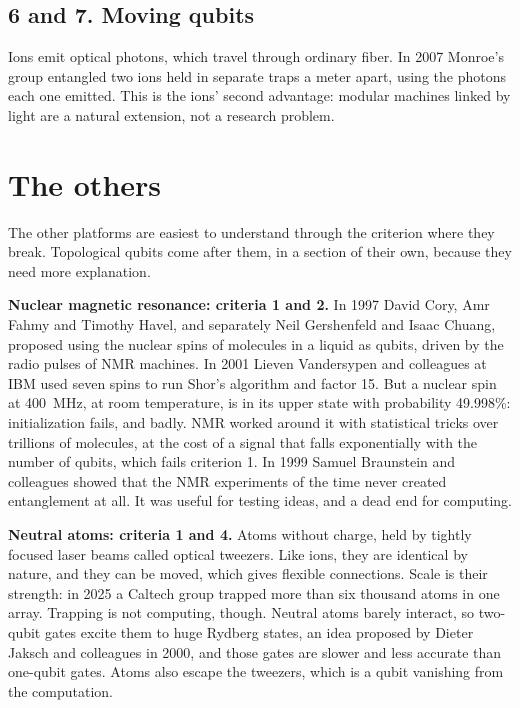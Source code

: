 \subsection*{6 and 7. Moving qubits}

Ions emit optical photons, which travel through ordinary fiber. In 2007 Monroe's group
entangled two ions held in separate traps a meter apart, using the photons each one
emitted. This is the ions' second advantage: modular machines linked by light are a natural
extension, not a research problem.

\section{The others}\label{sec:others}

The other platforms are easiest to understand through the criterion where they break. Topological
qubits come after them, in a section of their own, because they need more explanation.

\textbf{Nuclear magnetic resonance: criteria 1 and 2.} In 1997 David Cory, Amr Fahmy and
Timothy Havel, and separately Neil Gershenfeld and Isaac Chuang, proposed using the nuclear
spins of molecules in a liquid as qubits, driven by the radio pulses of NMR machines. In 2001
Lieven Vandersypen and colleagues at IBM used seven spins to run Shor's algorithm and factor
15. But a nuclear spin at 400~MHz, at room temperature, is in its upper state with probability
49.998\%: initialization fails, and badly. NMR worked around it with statistical tricks over
trillions of molecules, at the cost of a signal that falls exponentially with the number of
qubits, which fails criterion 1. In 1999 Samuel Braunstein and colleagues showed that the NMR
experiments of the time never created entanglement at all. It was useful for testing ideas, and
a dead end for computing.

\textbf{Neutral atoms: criteria 1 and 4.} Atoms without charge, held by tightly focused laser
beams called optical tweezers. Like ions, they are identical by nature, and they can be moved,
which gives flexible connections. Scale is their strength: in 2025 a Caltech group trapped more
than six thousand atoms in one array. Trapping is not computing, though. Neutral atoms barely
interact, so two-qubit gates excite them to huge Rydberg states, an idea proposed by Dieter
Jaksch and colleagues in 2000, and those gates are slower and less accurate than one-qubit gates.
Atoms also escape the tweezers, which is a qubit vanishing from the computation.

